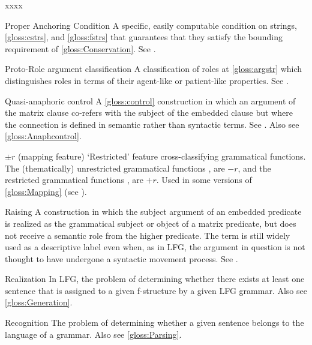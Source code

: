 \documentclass[output=paper,colorlinks,citecolor=brown]{langscibook}
\begin{document}
\begin{labeling}{xxxx}
\item[Proper Anchoring Condition\namedlabel{gloss:PAC}{Proper Anchoring Condition}] A specific, easily computable condition on strings, \ref{gloss:cstrs}, and \ref{gloss:fstrs} that guarantees that they satisfy the bounding requirement of \ref{gloss:Conservation}. See .

\item[Proto-Role argument classification] A classification of roles at \ref{gloss:argstr} which distinguishes roles in terms of their agent-like or patient-like properties.  See .

\item[Quasi-anaphoric control\namedlabel{gloss:quasi-anaphoric}{quasi-anaphoric}] A \ref{gloss:control} construction in which an argument of the matrix clause co-refers with the subject of the embedded clause but where the connection is defined in semantic rather than syntactic terms. See .  Also see \ref{gloss:Anaphcontrol}. 
  
\item[{${\pm}r$}\namedlabel{gloss:r}{$\underline{+}r$}] (mapping feature) `Restricted' feature cross-classifying grammatical functions.  The (thematically) unrestricted grammatical functions \SUBJ, \OBJ are $-r$, and the restricted grammatical functions \OBJTHETA, \OBLTHETA are $+r$.  Used in some versions of \ref{gloss:Mapping} (see ).

\item[Raising\namedlabel{gloss:raising}{raising}] A construction in which the subject argument of an embedded predicate is realized as the grammatical subject or object of a matrix predicate, but does not receive a semantic role from the higher predicate. The term is still widely used as a descriptive label even when, as in LFG, the argument in question is not thought to have undergone a syntactic movement process. See .
  
\item[Realization\namedlabel{gloss:realized}{realized}\namedlabel{gloss:Realization}{Realization}] In LFG, the problem of determining whether there exists at least one sentence that is assigned to a given f-structure by a given LFG grammar.  Also see \ref{gloss:Generation}.

\item[Recognition\namedlabel{gloss:recognized}{recognized}] The problem of determining whether a given sentence belongs to the language of a grammar.  Also see \ref{gloss:Parsing}.


\end{labeling}
\end{document}
